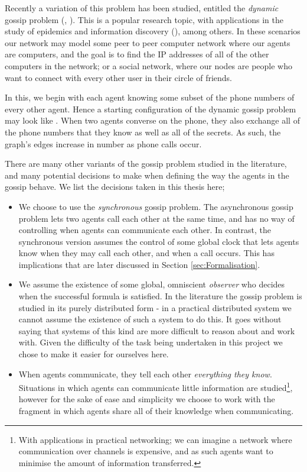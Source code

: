 \documentclass[10pt, a4paper]{report}
\begin{document}
Recently a variation of this problem has been studied, entitled the
\emph{dynamic} gossip problem (\cite{DynamicGossip}, \cite{EpProforDyGo}). This
is a popular research topic, with applications in the study of epidemics and
information discovery (\cite{DiscoverythruGossip}), among others. In these
scenarios our network may model some peer to peer computer network where our
agents are computers, and the goal is to find the IP addresses of all of the
other computers in the network; or a social network, where our nodes are people
who want to connect with every other user in their circle of friends.

In this, we begin with each agent knowing some subset of the phone
numbers of every other agent. Hence a starting configuration of the dynamic
gossip problem may look like . When two agents
converse on the phone, they also exchange all of the phone numbers that they
know as well as all of the secrets. As such, the graph's edges increase in
number as phone calls occur.

There are many other variants of the gossip problem studied in the literature,
and many potential decisions to make when defining the way the agents in the
gossip behave. We list the decisions taken in this thesis here;

\begin{itemize}
  \item We choose to use the \emph{synchronous} gossip problem. The asynchronous
    gossip problem lets two agents call each other at the same time, and has no
    way of controlling when agents can communicate each other. In contrast, the
    synchronous version assumes the control of some global clock that lets
    agents know when they may call each other, and when a call occurs. This has
    implications that are later discussed in Section \ref{sec:Formalisation}.
  \item We assume the existence of some global, omniscient \emph{observer} who
    decides when the successful formula is satisfied. In the literature the
    gossip problem is studied in its purely distributed form - in a practical
    distributed system we cannot assume the existence of such a system to do
    this. It goes without saying that systems of this kind are more difficult to
    reason about and work with. Given the difficulty of the task being
    undertaken in this project we chose to make it easier for ourselves here.
  \item When agents communicate, they tell each other \emph{everything they
      know}. Situations in which agents can communicate little information are
    studied\footnote{With applications in practical networking; we can imagine a
    network where communication over channels is expensive, and as such agents
    want to minimise the amount of information transferred.}, however for the
  sake of ease and simplicity we choose to work with the fragment in which
  agents share all of their knowledge when communicating. 
\end{itemize}
\end{document}
